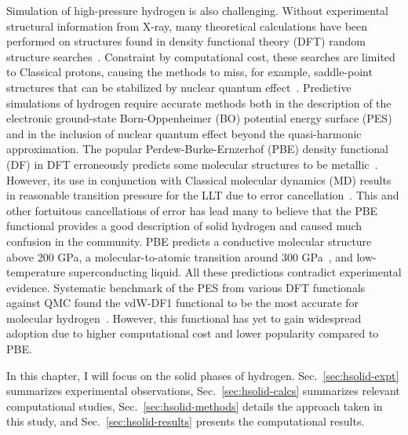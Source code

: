 Simulation of high-pressure hydrogen is also challenging. Without experimental structural information from X-ray, many theoretical calculations have been performed on structures found in density functional theory (DFT) random structure searches~\cite{Pickard2007}. Constraint by computational cost, these searches are limited to Classical protons, causing the methods to miss, for example, saddle-point structures that can be stabilized by nuclear quantum effect~\cite{Monserrat2016}.
Predictive simulations of hydrogen require accurate methods both in the description of the electronic ground-state Born-Oppenheimer (BO) potential energy surface (PES) and in the inclusion of nuclear quantum effect beyond the quasi-harmonic approximation.
The popular Perdew-Burke-Ernzerhof (PBE) density functional (DF) in DFT erroneously predicts some molecular structures to be metallic~\cite{Drummond2015}. However, its use in conjunction with Classical molecular dynamics (MD) results in reasonable transition pressure for the LLT due to error cancellation~\cite{Morales2013a}.
This and other fortuitous cancellations of error has lead many to believe that the PBE functional provides a good description of solid hydrogen and caused much confusion in the community. PBE predicts a conductive molecular structure above 200 GPa, a molecular-to-atomic transition around 300 GPa~\cite{McMinis2015}, and low-temperature superconducting liquid. All these predictions contradict experimental evidence. Systematic benchmark of the PES from various DFT functionals against QMC found the vdW-DF1 functional to be the most accurate for molecular hydrogen~\cite{Clay2016}. However, this functional has yet to gain widespread adoption due to higher computational cost and lower popularity compared to PBE.

In this chapter, I will focus on the solid phases of hydrogen. Sec.~\ref{sec:hsolid-expt} summarizes experimental observations, Sec.~\ref{sec:hsolid-calcs} summarizes relevant computational studies,
Sec.~\ref{sec:hsolid-methods} details the approach taken in this study,
and Sec.~\ref{sec:hsolid-results} presents the computational results.

